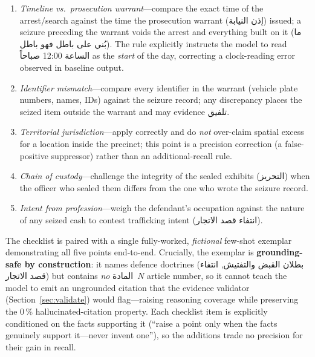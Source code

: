 \documentclass[final,1p,times]{elsarticle}
\newcommand{\ar}[1]{{\arabicfont\beginR #1\endR}}
\begin{document}
\begin{enumerate}
  \item[\textbf{A.}] \emph{Timeline vs.\ prosecution warrant}---compare the
        exact time of the arrest/search against the time the prosecution
        warrant (\ar{إذن النيابة}) issued; a seizure preceding the warrant
        voids the arrest and everything built on it
        (\ar{ما بُني على باطل فهو باطل}). The rule explicitly instructs the
        model to read \ar{الساعة 12:00 صباحاً} as the \emph{start} of the day,
        correcting a clock-reading error observed in baseline output.
  \item[\textbf{B.}] \emph{Identifier mismatch}---compare every identifier in
        the warrant (vehicle plate numbers, names, IDs) against the seizure
        record; any discrepancy places the seized item outside the warrant
        and may evidence \ar{تلفيق}.
  \item[\textbf{C.}] \emph{Territorial jurisdiction}---apply correctly and do
        \emph{not} over-claim spatial excess for a location inside the
        precinct; this point is a precision correction (a false-positive
        suppressor) rather than an additional-recall rule.
  \item[\textbf{D.}] \emph{Chain of custody}---challenge the integrity of the
        sealed exhibits (\ar{التحريز}) when the officer who sealed them
        differs from the one who wrote the seizure record.
  \item[\textbf{E.}] \emph{Intent from profession}---weigh the defendant's
        occupation against the nature of any seized cash to contest
        trafficking intent (\ar{انتفاء قصد الاتجار}).
\end{enumerate}

The checklist is paired with a single fully-worked, \emph{fictional} few-shot
exemplar demonstrating all five points end-to-end. Crucially, the exemplar is
\textbf{grounding-safe by construction}: it names defence doctrines
(\ar{بطلان القبض والتفتيش}, \ar{انتفاء قصد الاتجار}) but contains
\emph{no} \ar{المادة}~$N$ article number, so it cannot teach the model to
emit an ungrounded citation that the evidence validator
(Section~\ref{sec:validate}) would flag---raising reasoning coverage while
preserving the 0\,\% hallucinated-citation property. Each checklist item is
explicitly conditioned on the facts supporting it (``raise a point only when
the facts genuinely support it---never invent one''), so the additions
trade no precision for their gain in recall.
\end{document}
